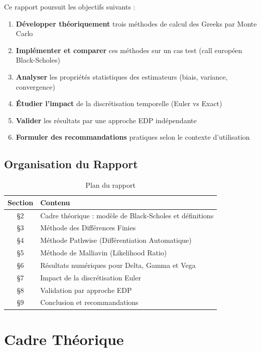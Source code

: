 \documentclass[a4paper,11pt]{article}
\theoremstyle{definition}
\begin{document}
Ce rapport poursuit les objectifs suivants :

\begin{enumerate}
    \item \textbf{Développer théoriquement} trois méthodes de calcul des Greeks par Monte Carlo
    \item \textbf{Implémenter et comparer} ces méthodes sur un cas test (call européen Black-Scholes)
    \item \textbf{Analyser} les propriétés statistiques des estimateurs (biais, variance, convergence)
    \item \textbf{Étudier l'impact} de la discrétisation temporelle (Euler vs Exact)
    \item \textbf{Valider} les résultats par une approche EDP indépendante
    \item \textbf{Formuler des recommandations} pratiques selon le contexte d'utilisation
\end{enumerate}

\subsection{Organisation du Rapport}

\begin{table}[H]
\centering
\begin{tabular}{cl}
\toprule
\textbf{Section} & \textbf{Contenu} \\
\midrule
\S 2 & Cadre théorique : modèle de Black-Scholes et définitions \\
\S 3 & Méthode des Différences Finies \\
\S 4 & Méthode Pathwise (Différentiation Automatique) \\
\S 5 & Méthode de Malliavin (Likelihood Ratio) \\
\S 6 & Résultats numériques pour Delta, Gamma et Vega \\
\S 7 & Impact de la discrétisation Euler \\
\S 8 & Validation par approche EDP \\
\S 9 & Conclusion et recommandations \\
\bottomrule
\end{tabular}
\caption{Plan du rapport}
\end{table}

\section{Cadre Théorique}
\end{document}
